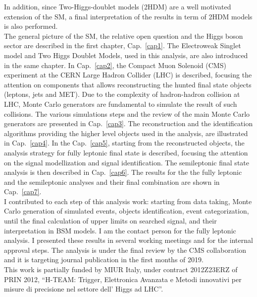 \documentclass[PhD,binding=0.6cm]{../sapthesis}
\begin{document}
In addition, since  Two-Higgs-doublet models (2HDM)  are a well motivated extension of the SM, a final interpretation of the results in term of 2HDM models is also performed.\\
\newline
The general picture of the SM,  the relative open question and the Higgs boson sector  are described in the first chapter, Cap.~\ref{cap1}. 
The  Electroweak  Singlet model and Two Higgs Doublet Models, used in this analysis, are also introduced in the same chapter. 
In Cap.~\ref{cap2}, the Compact Muon Solenoid (CMS) experiment at the
CERN Large Hadron Collider (LHC) is described, focusing the attention
on components that allows reconstructing the hunted final state
objects (leptons, jets and MET).
Due to the complexity of  hadron-hadron collision at LHC, Monte Carlo generators are fundamental to simulate the result of such  collisions. 
The various simulations steps and the review of the main Monte Carlo generators are presented in Cap.~\ref{cap3}.
The reconstruction and the identification algorithms providing the
higher level objects used in the analysis, are illustrated in Cap.~\ref{cap4}.
In the Cap.~\ref{cap5}, starting from the reconstructed objects, the analysis strategy for fully leptonic final state  is described, focusing the attention on the signal  modellization and signal identification.
The semileptonic final state analysis is then described in Cap.~\ref{cap6}.
The results for the the fully leptonic and the semileptonic analyses and their final  combination are shown in Cap.~\ref{cap7}.\\
\newline
I contributed to each step of this analysis work: starting from data taking, Monte Carlo generation of simulated events, objects identification, event categorization, until the final calculation of upper limits on searched signal, and their interpretation in BSM models. I am the contact person for the fully leptonic analysis. I presented these results in several working meetings and for the internal approval steps. The analysis is under the final review  by the CMS collaboration and it is targeting journal publication in the first months of 2019.\\
\newline
This work is partially funded by MIUR Italy, under contract 2012Z23ERZ of PRIN 2012, ``H-TEAM: Trigger, Elettronica Avanzata e Metodi innovativi per misure di precisione nel settore dell’ Higgs ad LHC''.
\end{document}
